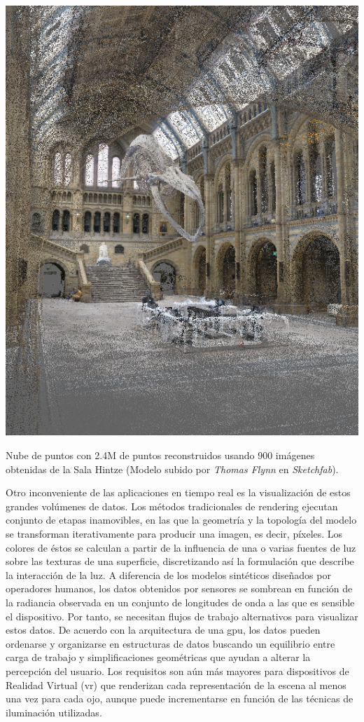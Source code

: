 \begin{marginfigure}[.5cm]
	\includegraphics{figs/introduction/hintze.png}
	\caption{Nube de puntos con 2.4M de puntos reconstruidos usando 900 imágenes obtenidas de la Sala Hintze (Modelo subido por \textit{Thomas Flynn} en \textit{Sketchfab}).  }
	\label{fig:hintze_hall_spanish}
\end{marginfigure}
Otro inconveniente de las aplicaciones en tiempo real es la visualización de estos grandes volúmenes de datos. Los métodos tradicionales de rendering ejecutan conjunto de etapas inamovibles, en las que la geometría y la topología del modelo se transforman iterativamente para producir una imagen, es decir, píxeles. Los colores de éstos se calculan a partir de la influencia de una o varias fuentes de luz sobre las texturas de una superficie, discretizando así la formulación que describe la interacción de la luz. A diferencia de los modelos sintéticos diseñados por operadores humanos, los datos obtenidos por sensores se sombrean en función de la radiancia observada en un conjunto de longitudes de onda a las que es sensible el dispositivo. Por tanto, se necesitan flujos de trabajo alternativos para visualizar estos datos. De acuerdo con la arquitectura de una \acrshort{gpu}, los datos pueden ordenarse y organizarse en estructuras de datos buscando un equilibrio entre carga de trabajo y simplificaciones geométricas que ayudan a alterar la percepción del usuario. Los requisitos son aún más mayores para dispositivos de Realidad Virtual (\acrshort{vr}) que renderizan cada representación de la escena al menos una vez para cada ojo, aunque puede incrementarse en función de las técnicas de iluminación utilizadas.

